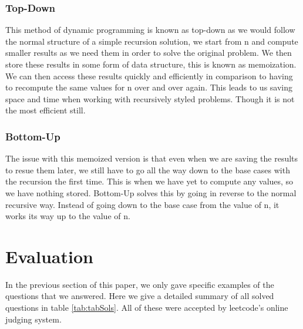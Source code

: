 \documentclass[10pt,twocolumn]{IEEEtran}
\begin{document}
	\subsubsection{Top-Down}
	This method of dynamic programming is known as top-down as we would follow the normal structure of a simple recursion solution, we start from n and compute smaller results as we need them in order to solve the original problem. We then store these results in some 		form of data structure, this is known as memoization. We can then access these results quickly and efficiently in comparison to having to recompute the same values for n over and over again. This leads to us saving space and time when working with recursively styled 		problems. Though it is not the most efficient still. 

	\subsubsection{Bottom-Up}
	The issue with this memoized version is that even when we are saving the results to resue them later, we still have to go all the way down to the base cases with the recursion the first time. This is when we have yet to compute any values, so we have nothing stored.
	Bottom-Up solves this by going in reverse to the normal recursive way. Instead of going down to the base case from the value of n, it works its way up to the value of n.   
\section{Evaluation}
In the previous section of this paper, we only gave specific examples of the questions that we answered. Here we give a detailed summary of all solved questions in table \ref{tab:tabSols}. All of these were accepted by leetcode's online judging system. 
\end{document}
